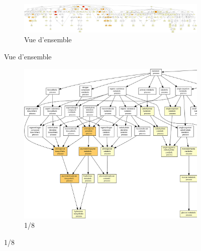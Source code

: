\begin{figure}
\begin{subfigure}{\textwidth}
\includegraphics[width=\textwidth]
{Figures/tfc-go-all-graph/tfc-go-all-graph.png}
\caption{Vue d'ensemble}
\end{subfigure}
\end{figure}

\begin{figure}[p]
\ContinuedFloat
\begin{subfigure}{\textwidth}
\includegraphics[width=\textwidth]
{Figures/tfc-go-all-graph/tfc-go-all-graph_0.png}
\caption{1/8}
\end{subfigure}
\end{figure}

